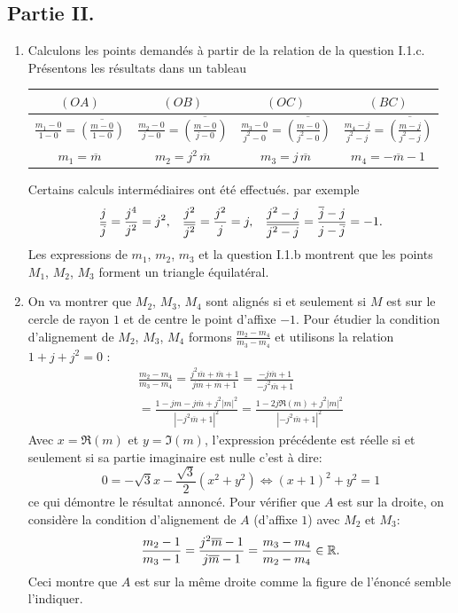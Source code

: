 \subsection*{Partie II.}
\begin{enumerate}
 \item Calculons les points demandés à partir de la relation de la question I.1.c. Présentons les résultats dans un tableau 
\begin{center}
\renewcommand{\arraystretch}{1.8}
\begin{tabular}{|c|c|c|c|} \hline
$(OA)$   & $(OB)$   & $(OC)$   & $(BC)$\\ \hline
$\frac{m_1-0}{1-0} = \overline{\left(\frac{m-0}{1-0}\right)}$ & 
$\frac{m_2-0}{j-0} = \overline{\left(\frac{m-0}{j-0}\right)}$ & 
$\frac{m_3-0}{j^2-0} = \overline{\left(\frac{m-0}{j^2-0}\right)}$ & 
$\frac{m_4-j}{j^2-j} = \overline{\left(\frac{m-j}{j^2-j}\right)}$\\ \hline
$m_1 = \overline{m}$ & $m_2 = j^2\, \overline{m}$ & $m_3 = j\,\overline{m}$ & $m_4 = -\overline{m} -1 $ \\ \hline
\end{tabular}
\end{center}
Certains calculs intermédiaires ont été effectués. par exemple
\[
  \frac{j}{\overline{j}} = \frac{j^4}{j^2} = j^2,\hspace{0.3cm}
  \frac{j^2}{\overline{j^2}} = \frac{j^2}{j} = j,\hspace{0.3cm}
  \frac{j^2 - j}{\overline{j^2 - j}} = \frac{\overline{j} - j}{j - \overline{j}} = -1.
\]
Les expressions de $m_1$, $m_2$, $m_3$ et la question I.1.b montrent que les points $M_1$, $M_2$, $M_3$ forment un triangle équilatéral.

\item On va montrer que $M_2$, $M_3$, $M_4$ sont alignés si et seulement si $M$ est sur le cercle de rayon $1$ et de centre le point d'affixe $-1$.\newline
Pour étudier la condition d'alignement de $M_2$, $M_3$, $M_4$ formons $\frac{m_2-m_4}{m_3-m_4}$ et utilisons la relation $1+j+j^2=0$ :
\begin{multline*}
 \frac{m_2-m_4}{m_3-m_4} = \frac{j^2\overline{m}+\overline{m}+1}{j\overline{m}+\overline{m}+1} 
= \frac{-j\overline{m}+1}{-j^2\overline{m}+1} \\ 
= \frac{1-jm -j\overline{m}+j^2|m|^2}{|-j^2\overline{m}+1|^2}
= \frac{1-2j\Re(m)+j^2|m|^2 }{|-j^2\overline{m}+1|^2}
\end{multline*}
Avec $x=\Re(m)$ et $y=\Im(m)$, l'expression précédente est réelle si et seulement si sa partie imaginaire est nulle c'est à dire:
\begin{displaymath}
 0=-\sqrt{3}x-\frac{\sqrt{3}}{2}(x^2+y^2) \Leftrightarrow (x+1)^2 + y^2 = 1
\end{displaymath}
ce qui démontre le résultat annoncé.\newline
Pour vérifier que $A$ est sur la droite, on considère la condition d'alignement de $A$ (d'affixe $1$) avec $M_2$ et $M_3$:
\[
 \frac{m_2 - 1}{m_3 - 1} = \frac{j^2 \overline{m} -1}{j \overline{m} -1} = \frac{m_3 - m_4}{m_2 - m_4} \in \mathbb{R}. 
\]
Ceci montre que $A$ est sur la même droite comme la figure de l'énoncé semble l'indiquer.


\end{enumerate}
